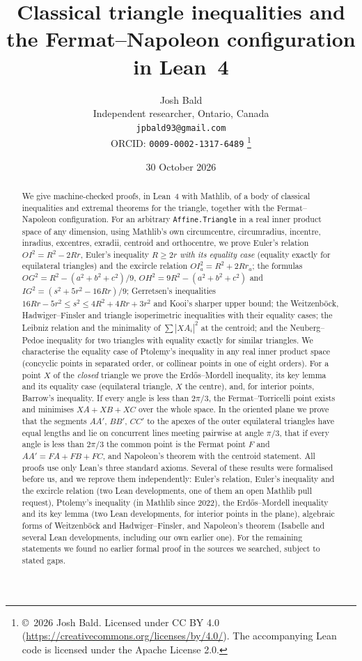 \documentclass[11pt]{article}
\title{Classical triangle inequalities and the Fermat--Napoleon configuration in Lean~4}
\author{Josh Bald\\ \small Independent researcher, Ontario, Canada\\ \small\texttt{jpbald93@gmail.com}\\
\small ORCID: \texttt{0009-0002-1317-6489}
\thanks{\copyright~2026 Josh Bald. Licensed under CC BY 4.0 (\url{https://creativecommons.org/licenses/by/4.0/}). The accompanying Lean code is licensed under the Apache License 2.0.}}
\date{30 October 2026}
\theoremstyle{definition}
\theoremstyle{remark}
\newcommand{\lean}[1]{\texttt{#1}}
\begin{document}
\sloppy
\maketitle
\begin{abstract}
We give machine-checked proofs, in Lean~4 with Mathlib, of a body of classical inequalities and
extremal theorems for the triangle, together with the Fermat--Napoleon configuration. For an
arbitrary \lean{Affine.Triangle} in a real inner product space of any dimension, using Mathlib's own
circumcentre, circumradius, incentre, inradius, excentres, exradii, centroid and orthocentre, we
prove Euler's relation $OI^2=R^2-2Rr$, Euler's inequality $R\ge 2r$ \emph{with its equality case}
(equality exactly for equilateral triangles) and the excircle relation $OI_a^2=R^2+2Rr_a$; the
formulas $OG^2=R^2-(a^2+b^2+c^2)/9$, $OH^2=9R^2-(a^2+b^2+c^2)$ and $IG^2=(s^2+5r^2-16Rr)/9$;
Gerretsen's inequalities $16Rr-5r^2\le s^2\le 4R^2+4Rr+3r^2$ and Kooi's sharper upper bound;
the Weitzenb\"ock, Hadwiger--Finsler and triangle isoperimetric inequalities with their equality
cases; the Leibniz relation and the minimality of $\sum|XA_i|^2$ at the centroid; and the
Neuberg--Pedoe inequality for two triangles with equality exactly for similar triangles. We
characterise the equality case of Ptolemy's inequality in any real inner product space (concyclic
points in separated order, or collinear points in one of eight orders). For a point $X$ of the
\emph{closed} triangle we prove the Erdős--Mordell inequality, its key lemma and its equality case
(equilateral triangle, $X$ the centre), and, for interior points, Barrow's inequality. If every
angle is less than $2\pi/3$, the Fermat--Torricelli point exists and minimises $XA+XB+XC$ over the
whole space. In the oriented plane we prove that the segments $AA'$, $BB'$, $CC'$ to the apexes of the
outer equilateral triangles have equal lengths and lie on concurrent lines meeting pairwise at angle
$\pi/3$, that if every angle is less than $2\pi/3$ the common point is the Fermat point $F$ and
$AA'=FA+FB+FC$, and Napoleon's theorem with the centroid
statement. All proofs use only Lean's three standard axioms. Several of these results were
formalised before us, and we reprove them independently: Euler's relation, Euler's inequality and the excircle
relation (two Lean developments, one of them an open Mathlib pull request), Ptolemy's inequality (in
Mathlib since 2022), the Erdős--Mordell inequality and its key lemma (two Lean developments, for
interior points in the plane), algebraic forms of Weitzenb\"ock and Hadwiger--Finsler, and Napoleon's
theorem (Isabelle and several Lean developments, including our own earlier one). For the remaining
statements we found no earlier formal proof in the sources we searched, subject to stated gaps.
\end{abstract}
\end{document}
